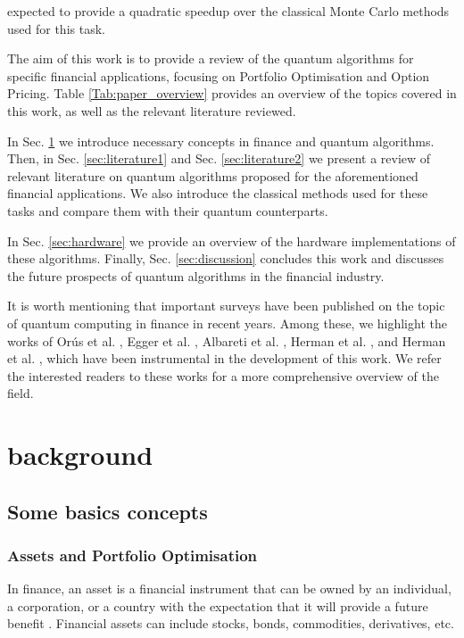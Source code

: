 \documentclass[prx,twocolumn,floatfix,superscriptaddress,longbibliography]{revtex4-1}
\begin{document}
expected to provide a quadratic speedup over the classical Monte Carlo methods used for this task. 

The aim of this work is to provide a review of the quantum algorithms for specific financial applications, focusing on Portfolio Optimisation and Option Pricing. Table \ref{Tab:paper_overview} provides an overview of the topics covered in this work, as well as the relevant literature reviewed. 

In Sec. \ref{sec:background} we introduce necessary concepts in finance and quantum algorithms. Then, in Sec. \ref{sec:literature1} and Sec. \ref{sec:literature2}  we present a review of relevant literature on quantum algorithms proposed for the aforementioned financial applications. We also 
  introduce the classical methods used for these tasks and compare them with their quantum counterparts.

In Sec. \ref{sec:hardware} we provide an overview of the hardware implementations of these algorithms. Finally, Sec. \ref{sec:discussion} concludes this work and discusses the future prospects of quantum algorithms in the financial industry. 

It is worth mentioning that important surveys have been published on the topic of quantum computing in finance in recent years. Among these, we highlight the works of Orús et al. \cite{Orus2019}, Egger et al. \cite{Egger2020a}, Albareti et al. \cite{Albareti2022}, Herman et al. \cite{Herman2022}, and Herman et al. \cite{Herman2023}, which have been instrumental in the development of this work. We refer the interested readers to these works for a more comprehensive overview of the field.

\section{background}\label{sec:background}
\subsection{Some basics concepts}
\subsubsection{Assets and Portfolio Optimisation}

In finance, an asset is a financial instrument that can be owned by an individual, a corporation, or a country with the expectation that it will provide a future benefit \cite{2023}. Financial assets can include stocks, bonds, commodities, derivatives, etc. 
\end{document}
